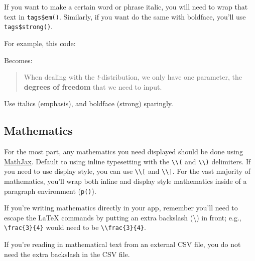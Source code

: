 \documentclass[
]{book}
\newenvironment{Shaded}{\begin{snugshade}}{\end{snugshade}}
\newcommand{\KeywordTok}[1]{\textcolor[rgb]{0.13,0.29,0.53}{\textbf{#1}}}
\newcommand{\NormalTok}[1]{#1}
\newcommand{\OperatorTok}[1]{\textcolor[rgb]{0.81,0.36,0.00}{\textbf{#1}}}
\newcommand{\StringTok}[1]{\textcolor[rgb]{0.31,0.60,0.02}{#1}}
\begin{document}
If you want to make a certain word or phrase italic, you will need to wrap that text in \texttt{tags\$em()}. Similarly, if you want do the same with boldface, you'll use \texttt{tags\$strong()}.

For example, this code:

\begin{Shaded}
\end{Shaded}

Becomes:

\begin{quote}
When dealing with the \emph{t}-distribution, we only have one parameter, the \textbf{degrees of freedom} that we need to input.
\end{quote}

Use italics (emphasis), and boldface (strong) sparingly.

\hypertarget{mathematics}{%
\subsection{Mathematics}\label{mathematics}}

For the most part, any mathematics you need displayed should be done using \href{https://www.mathjax.org/}{MathJax}. Default to using inline typesetting with the \texttt{\textbackslash{}\textbackslash{}(} and \texttt{\textbackslash{}\textbackslash{})} delimiters. If you need to use display style, you can use \texttt{\textbackslash{}\textbackslash{}{[}} and \texttt{\textbackslash{}\textbackslash{}{]}}. For the vast majority of mathematics, you'll wrap both inline and display style mathematics inside of a paragraph environment (\texttt{p()}).

If you're writing mathematics directly in your app, remember you'll need to escape the LaTeX commands by putting an extra backslash (\textbackslash) in front; e.g., \texttt{\textbackslash{}frac\{3\}\{4\}} would need to be \texttt{\textbackslash{}\textbackslash{}frac\{3\}\{4\}}.

If you're reading in mathematical text from an external CSV file, you do not need the extra backslash in the CSV file.
\end{document}
